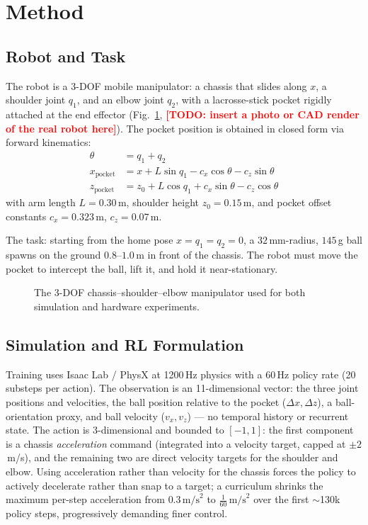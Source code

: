 \documentclass[11pt]{article}
\newcommand{\todo}[1]{\textcolor{red}{\textbf{[TODO: #1]}}}
\begin{document}
\section{Method}
\label{sec:method}

\subsection{Robot and Task}

The robot is a 3-DOF mobile manipulator: a chassis that slides along $x$, a
shoulder joint $q_1$, and an elbow joint $q_2$, with a lacrosse-stick pocket
rigidly attached at the end effector (Fig.~\ref{fig:robot}, \todo{insert a
photo or CAD render of the real robot here}). The pocket position is obtained
in closed form via forward kinematics:
\begin{align}
  \theta &= q_1 + q_2 \\
  x_{\text{pocket}} &= x + L\sin q_1 - c_x \cos\theta - c_z \sin\theta \\
  z_{\text{pocket}} &= z_0 + L\cos q_1 + c_x \sin\theta - c_z \cos\theta
\end{align}
with arm length $L = 0.30$\,m, shoulder height $z_0 = 0.15$\,m, and pocket
offset constants $c_x = 0.323$\,m, $c_z = 0.07$\,m.

The task: starting from the home pose $x = q_1 = q_2 = 0$, a $32$\,mm-radius,
$145$\,g ball spawns on the ground $0.8$--$1.0$\,m in front of the chassis. The
robot must move the pocket to intercept the ball, lift it, and hold it
near-stationary.

\begin{figure}[h]
  \centering
  \fbox{\parbox{0.6\textwidth}{\centering\vspace{2cm}\todo{robot photo / render}\vspace{2cm}}}
  \caption{The 3-DOF chassis--shoulder--elbow manipulator used for both
  simulation and hardware experiments.}
  \label{fig:robot}
\end{figure}

\subsection{Simulation and RL Formulation}

Training uses Isaac Lab / PhysX at 1200\,Hz physics with a 60\,Hz policy rate
(20 substeps per action). The observation is an 11-dimensional vector: the
three joint positions and velocities, the ball position relative to the pocket
($\Delta x, \Delta z$), a ball-orientation proxy, and ball velocity
($v_x, v_z$) --- no temporal history or recurrent state. The action is
3-dimensional and bounded to $[-1, 1]$: the first component is a chassis
\emph{acceleration} command (integrated into a velocity target, capped at
$\pm 2$\,m/s), and the remaining two are direct velocity targets for the
shoulder and elbow. Using acceleration rather than velocity for the chassis
forces the policy to actively decelerate rather than snap to a target; a
curriculum shrinks the maximum per-step acceleration from
$0.3\,\text{m/s}^2$ to $\tfrac{1}{60}\,\text{m/s}^2$ over the first
$\sim$130k policy steps, progressively demanding finer control.
\end{document}
